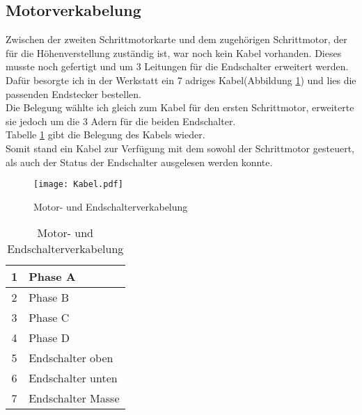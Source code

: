 \subsection{Motorverkabelung}
Zwischen der zweiten Schrittmotorkarte und dem zugehörigen Schrittmotor, der für die Höhenverstellung zuständig ist, war noch kein Kabel vorhanden. Dieses musste noch gefertigt und um 3 Leitungen für die Endschalter erweitert werden.\\
Dafür besorgte ich in der Werkstatt ein 7 adriges Kabel(Abbildung \ref{fig:Motorverkabelung}) und lies die passenden Endstecker bestellen.\\
Die Belegung wählte ich gleich zum Kabel für den ersten Schrittmotor, erweiterte sie jedoch um die 3 Adern für die beiden Endschalter.\\
Tabelle \ref{tab:Motorverkabelung} gibt die Belegung des Kabels wieder.\\
Somit stand ein Kabel zur Verfügung mit dem sowohl der Schrittmotor gesteuert, als auch der Status der Endschalter ausgelesen werden konnte.
\begin{figure}[h]
\centering
\texttt{[image: Kabel.pdf]}
\caption{Motor- und Endschalterverkabelung}
\label{fig:Motorverkabelung}
\end{figure}
\begin{longtable}{|c|l|} 
\caption{Motor- und Endschalterverkabelung} \\
\hline
\label{tab:Motorverkabelung}
1 & Phase A \\ 
\hline 
2 & Phase B \\ 
\hline 
3 & Phase C \\ 
\hline 
4 & Phase D \\ 
\hline 
5 & Endschalter oben \\ 
\hline 
6 & Endschalter unten \\ 
\hline 
7 & Endschalter Masse \\ 
\hline 
\end{longtable} 

